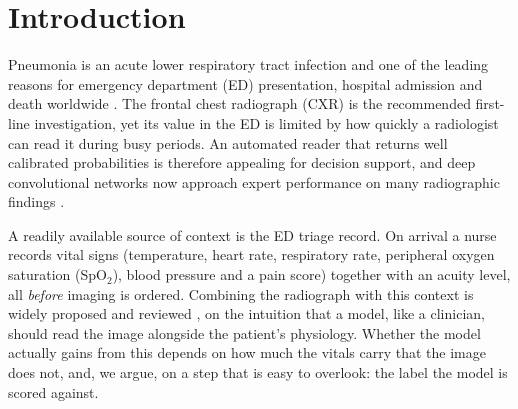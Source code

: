 \documentclass[twocolumn, final]{svjour3}
\begin{document}
\begin{abstract}
by demographics or by the administrative acuity score. Two cautions from the same cohort: a calibration advantage that looked
large in one run (ECE 0.040 vs 0.067) shrinks to $\Delta$ECE $-0.013\pm0.016$ across
seeds, and a fusion model can lean on which measurements are missing rather than on their
values.
\textbf{Conclusion:} Whether clinical context helps a chest-radiograph model depends on
the provenance of the label it is scored against. A target read from the image makes the
same triage information look redundant, while a clinically defined target makes it modestly
useful. Studies of multimodal fusion should state where their label comes from, because that
choice can decide the result.
\end{abstract}

\section{Introduction}
\label{sec:introduction}
Pneumonia is an acute lower respiratory tract infection and one of the leading reasons
for emergency department (ED) presentation, hospital admission and death worldwide
\citep{metlay2019idsa}. The frontal chest radiograph (CXR) is the recommended
first-line investigation, yet its value in the ED is limited by how quickly a
radiologist can read it during busy periods. An automated reader that returns well
calibrated probabilities is therefore appealing for decision support, and deep
convolutional networks now approach expert performance on many radiographic findings
\citep{huang2017densenet}.

A readily available source of context is the ED triage record. On arrival a nurse records
vital signs (temperature, heart rate, respiratory rate, peripheral oxygen saturation
(SpO$_2$), blood pressure and a pain score) together with an acuity level, all
\emph{before} imaging is ordered. Combining the radiograph with this context is widely
proposed and reviewed
\citep{acosta2022multimodal,huang2020fusion,hayat2022medfuse,soenksen2022multimodal}, on
the intuition that a model, like a clinician, should read the image alongside the patient's
physiology. Whether the model actually gains from this depends on how much the vitals
carry that the image does not, and, we argue, on a step that is easy to overlook: the
label the model is scored against.
\end{document}
